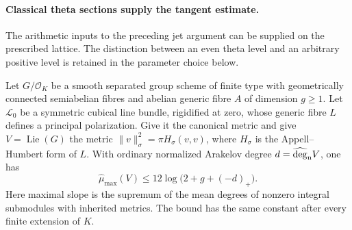 \paragraph{Classical theta sections supply the tangent estimate.}
The arithmetic inputs to the preceding jet argument can be supplied on
the prescribed lattice. The distinction between an even theta level and
an arbitrary positive level is retained in the parameter choice below.

\begin{theorem}\label{geo-classical-tangent-slope}
Let $G/\mathcal O_K$ be a smooth separated group scheme of finite type
with geometrically connected semiabelian fibres and abelian generic
fibre $A$ of dimension $g\ge1$. Let $\mathcal L_0$ be a symmetric
cubical line bundle, rigidified at zero, whose generic fibre $L$
defines a principal polarization. Give it the canonical metric and
give $V=\operatorname{Lie}(G)$ the metric
$\|v\|_\sigma^2=\pi H_\sigma(v,v)$, where $H_\sigma$ is the
Appell--Humbert form of $L$. With ordinary normalized Arakelov degree
$d=\widehat{\deg}_{\rm n}V$, one has
\begin{equation}\label{geo-classical-tangent-twelve}
 \widehat\mu_{\max}(V)
       \le12\log\bigl(2+g+(-d)_+\bigr).
\end{equation}
Here maximal slope is the supremum of the mean degrees of nonzero
integral submodules with inherited metrics. The bound has the same
constant after every finite extension of $K$.
\end{theorem}
